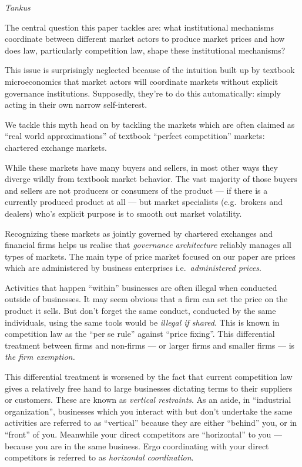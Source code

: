 \documentclass[
]{book}
\begin{document}
\emph{Tankus}

The central question this paper tackles are: what institutional mechanisms coordinate between different market actors to produce market prices and how does law, particularly competition law, shape these institutional mechanisms?

This issue is surprisingly neglected because of the intuition built up by textbook microeconomics that market actors will coordinate markets without explicit governance institutions. Supposedly, they're to do this automatically: simply acting in their own narrow self-interest.

We tackle this myth head on by tackling the markets which are often claimed as ``real world approximations'' of textbook ``perfect competition'' markets: chartered exchange markets.

While these markets have many buyers and sellers, in most other ways they diverge wildly from textbook market behavior. The vast majority of those buyers and sellers are not producers or consumers of the product --- if there is a currently produced product at all --- but market specialists (e.g.~brokers and dealers) who's explicit purpose is to smooth out market volatility.

Recognizing these markets as jointly governed by chartered exchanges and financial firms helps us realise that \emph{governance architecture} reliably manages all types of markets.
The main type of price market focused on our paper are prices which are administered by business enterprises i.e.~\emph{administered prices}.

Activities that happen ``within'' businesses are often illegal when conducted outside of businesses. It may seem obvious that a firm can set the price on the product it sells. But don't forget the same conduct, conducted by the same individuals, using the same tools would be \emph{illegal if shared}.
This is known in competition law as the ``per se rule'' against ``price fixing''.
This differential treatment between firms and non-firms --- or larger firms and smaller firms --- is \emph{the firm exemption.}

This differential treatment is worsened by the fact that current competition law gives a relatively free hand to large businesses dictating terms to their suppliers or customers. These are known as \emph{vertical restraints}. As an aside, in ``industrial organization'', businesses which you interact with but don't undertake the same activities are referred to as ``vertical'' because they are either ``behind'' you, or in ``front'' of you. Meanwhile your direct competitors are ``horizontal'' to you --- because you are in the same business. Ergo coordinating with your direct competitors is referred to as \emph{horizontal coordination}.
\end{document}
